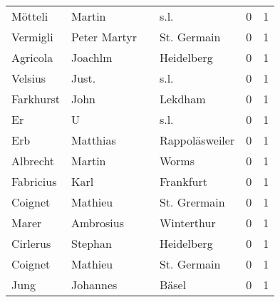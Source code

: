 \begin{tabular}{llllrr}
                  Mötteli &                             Martin &             &                                        s.l. &          0 &         1 \\
                 Vermigli &                       Peter Martyr &             &                                 St. Germain &          0 &         1 \\
                 Agricola &                            Joachlm &             &                                  Heidelberg &          0 &         1 \\
                  Velsius &                              Just. &             &                                        s.l. &          0 &         1 \\
                Farkhurst &                               John &             &                                     Lekdham &          0 &         1 \\
                       Er &                                  U &             &                                        s.l. &          0 &         1 \\
                      Erb &                           Matthias &             &                              Rappoläsweiler &          0 &         1 \\
                 Albrecht &                             Martin &             &                                       Worms &          0 &         1 \\
                Fabricius &                               Karl &             &                                   Frankfurt &          0 &         1 \\
                  Coignet &                            Mathieu &             &                                St. Grermain &          0 &         1 \\
                    Marer &                          Ambrosius &             &                                  Winterthur &          0 &         1 \\
                 Cirlerus &                            Stephan &             &                                  Heidelberg &          0 &         1 \\
                  Coignet &                            Mathieu &             &                                 St. Germain &          0 &         1 \\
                     Jung &                           Johannes &             &                                       Bäsel &          0 &         1 \\

\end{tabular}
